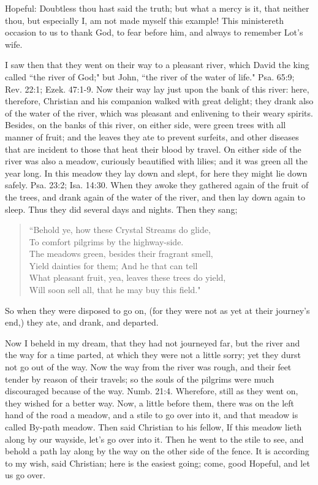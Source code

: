 Hopeful: Doubtless thou hast said the truth; but what a mercy is it, that neither thou, but especially I, am not made myself this example! This ministereth occasion to us to thank God, to fear before him, and always to remember Lot's wife.

I saw then that they went on their way to a pleasant river, which David the king called ``the river of God;" but John, ``the river of the water of life." Psa. 65:9; Rev. 22:1; Ezek. 47:1-9. Now their way lay just upon the bank of this river: here, therefore, Christian and his companion walked with great delight; they drank also of the water of the river, which was pleasant and enlivening to their weary spirits. Besides, on the banks of this river, on either side, were green trees with all manner of fruit; and the leaves they ate to prevent surfeits, and other diseases that are incident to those that heat their blood by travel. On either side of the river was also a meadow, curiously beautified with lilies; and it was green all the year long. In this meadow they lay down and slept, for here they might lie down safely. Psa. 23:2; Isa. 14:30. When they awoke they gathered again of the fruit of the trees, and drank again of the water of the river, and then lay down again to sleep. Thus they did several days and nights. Then they sang;
\begin{verse} 
``Behold ye, how these Crystal Streams do glide,\\
To comfort pilgrims by the highway-side.\\
The meadows green, besides their fragrant smell,\\
Yield dainties for them; And he that can tell\\
What pleasant fruit, yea, leaves these trees do yield,\\
Will soon sell all, that he may buy this field."\\ 
\end{verse}
So when they were disposed to go on, (for they were not as yet at their journey's end,) they ate, and drank, and departed.

Now I beheld in my dream, that they had not journeyed far, but the river and the way for a time parted, at which they were not a little sorry; yet they durst not go out of the way. Now the way from the river was rough, and their feet tender by reason of their travels; so the souls of the pilgrims were much discouraged because of the way. Numb. 21:4. Wherefore, still as they went on, they wished for a better way. Now, a little before them, there was on the left hand of the road a meadow, and a stile to go over into it, and that meadow is called By-path meadow. Then said Christian to his fellow, If this meadow lieth along by our wayside, let's go over into it. Then he went to the stile to see, and behold a path lay along by the way on the other side of the fence. It is according to my wish, said Christian; here is the easiest going; come, good Hopeful, and let us go over.

